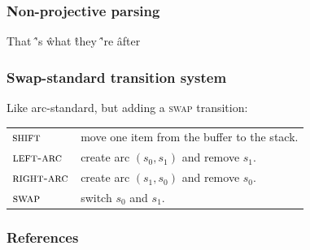 \documentclass[t]{beamer}
\begin{document}
\begin{frame}
  \frametitle{Non-projective parsing}
  \begin{center}
    \begin{dependency}
      \begin{deptext}[column sep=1.5em,ampersand replacement=\^,font=\rmfamily]
        That \^ 's \^ what \^ they \^ 're \^ after \\
      \end{deptext}
    \end{dependency}
  \end{center}
\end{frame}

\begin{frame}
  \frametitle{Swap-standard transition system}
  Like arc-standard, but adding a \textsc{swap} transition:

  \begin{tabular}{ll}
    $\textsc{shift}$ & move one item from the buffer to the stack. \\
    $\textsc{left-arc}$ & create arc $(s_0, s_1)$ and remove $s_1$. \\
    $\textsc{right-arc}$ & create arc $(s_1, s_0)$ and remove $s_0$. \\
    $\textsc{swap}$ & switch $s_0$ and $s_1$.
  \end{tabular}
\end{frame}

\begin{frame}[allowframebreaks]
\frametitle{References}

\tiny
\end{frame}
\end{document}
